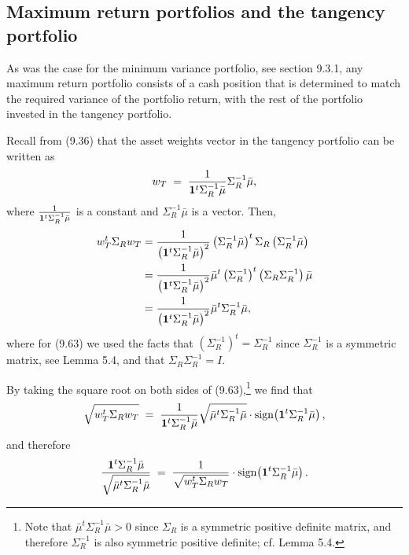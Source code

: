 
\subsection{Maximum return portfolios and the tangency portfolio}

As was the case for the minimum variance portfolio, see section 9.3.1, any maximum
return portfolio consists of a cash position that is determined to match the required
variance of the portfolio return, with the rest of the portfolio invested in the
tangency portfolio.

Recall from (9.36) that the asset weights vector in the tangency portfolio can be
written as
\begin{equation}
w_T \;=\; \frac{1}{\mathbf{1}^t\Sigma_R^{-1}\bar\mu}\Sigma_R^{-1}\bar\mu,
\end{equation}
where $\frac{1}{\mathbf{1}^t\Sigma_R^{-1}\bar\mu}$ is a constant and $\Sigma_R^{-1}\bar\mu$
is a vector. Then,
\begin{align}
w_T^t\Sigma_Rw_T &= \frac{1}{\left(\mathbf{1}^t\Sigma_R^{-1}\bar\mu\right)^2}
\left(\Sigma_R^{-1}\bar\mu\right)^t\Sigma_R\left(\Sigma_R^{-1}\bar\mu\right) \notag\\
&= \frac{1}{\left(\mathbf{1}^t\Sigma_R^{-1}\bar\mu\right)^2}
\bar\mu^t\left(\Sigma_R^{-1}\right)^t\left(\Sigma_R\Sigma_R^{-1}\right)\bar\mu \notag\\
&= \frac{1}{\left(\mathbf{1}^t\Sigma_R^{-1}\bar\mu\right)^2}\bar\mu^t\Sigma_R^{-1}\bar\mu,
\end{align}
where for (9.63) we used the facts that $\left(\Sigma_R^{-1}\right)^t=\Sigma_R^{-1}$
since $\Sigma_R^{-1}$ is a symmetric matrix, see Lemma 5.4, and that
$\Sigma_R\Sigma_R^{-1}=I$.

By taking the square root on both sides of (9.63),\footnote{Note that
$\bar\mu^t\Sigma_R^{-1}\bar\mu > 0$ since $\Sigma_R$ is a symmetric positive definite
matrix, and therefore $\Sigma_R^{-1}$ is also symmetric positive definite; cf. Lemma
5.4.} we find that
\[
\sqrt{w_T^t\Sigma_Rw_T} \;=\; \frac{1}{\mathbf{1}^t\Sigma_R^{-1}\bar\mu}
\sqrt{\bar\mu^t\Sigma_R^{-1}\bar\mu}\cdot
\operatorname{sign}\!\left(\mathbf{1}^t\Sigma_R^{-1}\bar\mu\right),
\]
and therefore
\begin{equation}
\frac{\mathbf{1}^t\Sigma_R^{-1}\bar\mu}{\sqrt{\bar\mu^t\Sigma_R^{-1}\bar\mu}} \;=\;
\frac{1}{\sqrt{w_T^t\Sigma_Rw_T}}\cdot
\operatorname{sign}\!\left(\mathbf{1}^t\Sigma_R^{-1}\bar\mu\right).
\end{equation}

